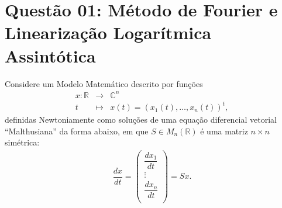 \chapter*{Questão 01: Método de Fourier e Linearização Logarítmica Assintótica}


Considere um Modelo Matemático descrito por funções
\[\begin{array}{rcl}
x: \mathbb{R} &\to& \mathbb{C}^n \\
t &\mapsto& x(t) = (x_1(t), \ldots, x_n(t))^t,
\end{array}\]
definidas Newtoniamente como soluções de uma equação diferencial vetorial ``Malthusiana'' da forma abaixo, em que \(S \in M_n(\mathbb{R})\) é uma matriz \(n \times n\) simétrica:
\begin{eqnarray}\label{eq:edoprova03q01}
\dfrac{dx}{dt} =
\left(\begin{array}{c}
\dfrac{dx_1}{dt} \\
\vdots \\
\dfrac{dx_n}{dt} \\
\end{array}\right) = Sx.
\end{eqnarray}

